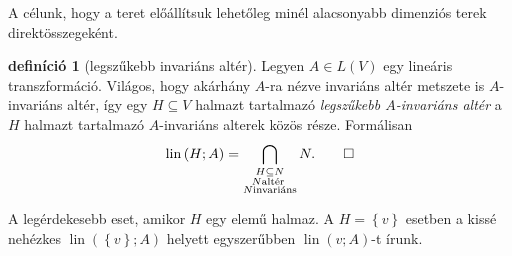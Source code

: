 \documentclass[9pt, a4paper, showtrims]{memoir}
\theoremstyle{plain}
\theoremstyle{remark}
\theoremstyle{definition}
\newtheorem{definition}[proposition]{definíció}
\DeclareMathOperator{\lin}{lin}
\begin{document}
A célunk, hogy a teret előállítsuk lehetőleg minél alacsonyabb dimenziós terek direktösszegeként.

\begin{definition}[legszűkebb invariáns altér]
    Legyen $A\in L\left( V \right)$ egy lineáris transzformáció.
    Világos, hogy akárhány $A$-ra nézve invariáns altér metszete is $A$-invariáns altér,
    így egy $H\subseteq V$ halmazt tartalmazó
    \emph{legszűkebb $A$-invariáns altér}
    a $H$ halmazt tartalmazó $A$-invariáns alterek közös része.
    Formálisan
    \[
        \lin\left( H;A \right)
        =
        \bigcap_{
            \substack{
                H\subseteq N\\ 
                N\text{altér }\\ 
                N\text{invariáns}}
            }N.\qedhere
        \]
    \end{definition}
    A legérdekesebb eset, amikor $H$ egy elemű halmaz.
    A $H=\left\{ v \right\}$ esetben a kissé nehézkes 
    $\lin\left( \left\{ v \right\};A \right)$ helyett egyszerűbben $\lin\left( v;A \right)$-t írunk.
\end{document}
